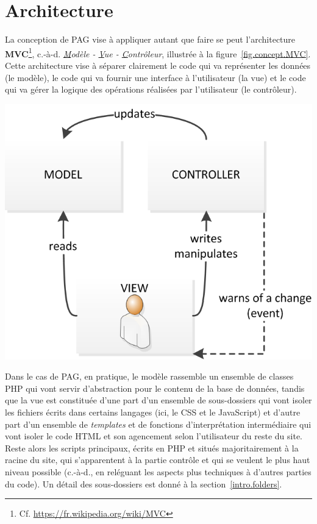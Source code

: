 \section{Architecture}\label{intro.archi}

La conception de PAG vise à appliquer autant que faire se peut l'architecture 
\textbf{MVC}\footnote{Cf. \url{https://fr.wikipedia.org/wiki/MVC}}, 
c.-à-d. \textit{\underline{M}odèle - \underline{V}ue - \underline{C}ontrôleur}, illustrée à 
la figure~\ref{fig.concept.MVC}. Cette architecture 
vise à séparer clairement le code qui va représenter les données (le modèle), le code qui va 
fournir une interface à l'utilisateur (la vue) et le code qui va gérer la logique des opérations 
réalisées par l'utilisateur (le contrôleur).

\begin{center}
    \includegraphics[scale=1.0]{figures/ModeleMVC.png}
	\label{fig.concept.MVC}
\end{center}

Dans le cas de PAG, en pratique, le modèle rassemble un ensemble de classes PHP qui vont servir 
d'abstraction pour le contenu de la base de données, tandis que la vue est constituée d'une part 
d'un ensemble de sous-dossiers qui vont isoler les fichiers écrits dans certains langages (ici, 
le CSS et le JavaScript) et d'autre part d'un ensemble de \textit{templates} et %
de fonctions d'interprétation intermédiaire qui vont isoler le code HTML et son agencement selon 
l'utilisateur du reste du site. Reste alors les scripts principaux, écrits en PHP et situés 
majoritairement à la racine du site, qui s'apparentent à la partie contrôle et qui se veulent le 
plus haut niveau possible (c.-à-d., en reléguant les aspects plus techniques à d'autres parties du 
code). Un détail des sous-dossiers est donné à la section~\ref{intro.folders}.

